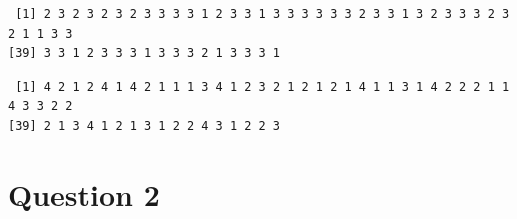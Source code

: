\documentclass[
  letterpaper,
  DIV=11,
  numbers=noendperiod]{scrartcl}
\newenvironment{Shaded}{}{}
\newcommand{\FunctionTok}[1]{\textcolor[rgb]{0.41,0.62,0.42}{#1}}
\newcommand{\NormalTok}[1]{\textcolor[rgb]{0.24,0.22,0.21}{#1}}
\newcommand{\SpecialCharTok}[1]{\textcolor[rgb]{0.69,0.38,0.53}{#1}}
\begin{document}
\begin{Shaded}
\end{Shaded}

\begin{verbatim}
 [1] 2 3 2 3 2 3 2 3 3 3 3 1 2 3 3 1 3 3 3 3 3 3 2 3 3 1 3 2 3 3 3 2 3 2 1 1 3 3
[39] 3 3 1 2 3 3 3 1 3 3 3 2 1 3 3 3 1
\end{verbatim}

\begin{Shaded}
\end{Shaded}

\begin{verbatim}
 [1] 4 2 1 2 4 1 4 2 1 1 1 3 4 1 2 3 2 1 2 1 2 1 4 1 1 3 1 4 2 2 2 1 1 4 3 3 2 2
[39] 2 1 3 4 1 2 1 3 1 2 2 4 3 1 2 2 3
\end{verbatim}

\newpage{}

\hypertarget{question-2}{%
\section{Question 2}\label{question-2}}
\end{document}
